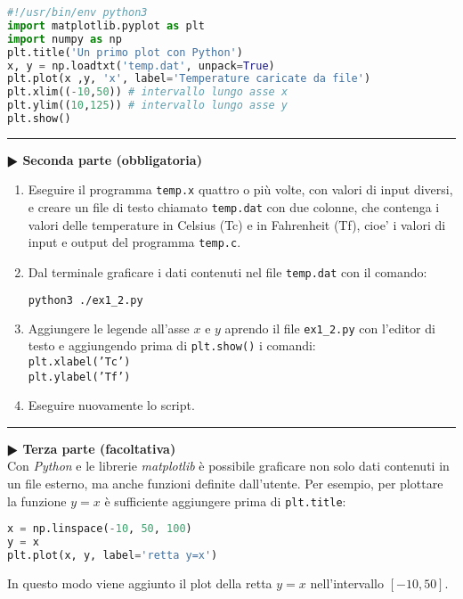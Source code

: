 \documentclass[11pt]{article}
\begin{document}
\newpage
\begin{lstlisting}[caption={Programma {\it python} \texttt{ex1\_2.py}},language=Python]
#!/usr/bin/env python3
import matplotlib.pyplot as plt
import numpy as np
plt.title('Un primo plot con Python')
x, y = np.loadtxt('temp.dat', unpack=True)
plt.plot(x ,y, 'x', label='Temperature caricate da file')
plt.xlim((-10,50)) # intervallo lungo asse x
plt.ylim((10,125)) # intervallo lungo asse y
plt.show()
\end{lstlisting}
\vspace{2mm}
\hrule
\vspace{2mm}
\textbf{$\RHD$ Seconda parte (obbligatoria)} 
%
\begin{enumerate}
\item Eseguire il programma \texttt{temp.x} quattro o pi\`u volte, con valori di input diversi, e creare un file di testo chiamato \texttt{temp.dat} con due colonne,
  che contenga i valori delle temperature in Celsius (Tc) e
  in Fahrenheit (Tf), cioe' i valori di input e output del programma \texttt{temp.c}.
\item Dal terminale graficare i dati contenuti nel file \texttt{temp.dat} con il comando:\\
  \begin{lstlisting}[language=bash,numbers=none]
    python3 ./ex1_2.py
\end{lstlisting}
\item Aggiungere le legende all'asse $x$ e $y$ aprendo il file \texttt{ex1_2.py} con l'editor di testo e aggiungendo prima di \texttt{plt.show()} i comandi:
\\
\texttt{plt.xlabel('Tc')}
\\
\texttt{plt.ylabel('Tf')}
 \item Eseguire nuovamente lo script.
 \end{enumerate}


\hrule
\vspace{2mm}\textbf{$\RHD$ Terza parte (facoltativa)\\}
%
Con {\it Python\/} e le librerie {\it matplotlib\/} \`e possibile graficare non solo dati contenuti in un file esterno, ma anche funzioni definite dall'utente. Per esempio, 
per plottare la funzione $y=x$ \`e sufficiente aggiungere prima di \texttt{plt.title}: 
\begin{lstlisting}[language=python]
x = np.linspace(-10, 50, 100)
y = x
plt.plot(x, y, label='retta y=x')
\end{lstlisting}
In questo modo viene aggiunto il plot della retta $y=x$ nell'intervallo $[-10,50]$. 
\end{document}
